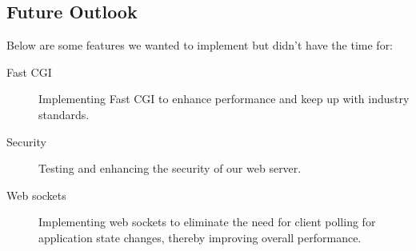 \subsection*{Future Outlook}
Below are some features we wanted to implement but didn't have the time for:
\begin{description}
    \item[Fast CGI]Implementing Fast CGI to enhance performance and keep up with industry standards.
    \item[Security]Testing and enhancing the security of our web server. 
    \item[Web sockets] Implementing web sockets to eliminate the need for client polling for application state changes, thereby improving overall performance.
\end{description}
